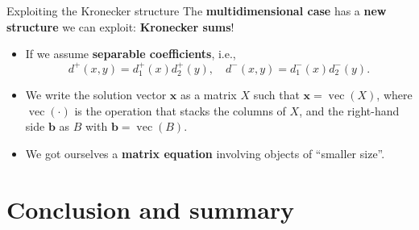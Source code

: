 \documentclass[aspectratio=169,xcolor=dvipsnames]{beamer}
\begin{document}
	\begin{frame}{Exploiting the Kronecker structure}
	The \textbf{multidimensional case} has a \textbf{new structure} we can exploit: \textbf{Kronecker sums}!
	\only<1>{
	\[A_\mathbf{N} = \nu I_\mathbf{N} - \left( D_\mathbf{N}^+ (G_{N_x} \otimes I_{N_y}) +  D_\mathbf{N}^- (I_{N_x} \otimes G_{N_y}) \right), \qquad \mathbf{N} = (N_x,N_y).\]
	}
	\only<2-3>{
	\[A_\mathbf{N} = \nu I_{N_x} \otimes I_{N_y} - \left( D_\mathbf{N}^+ (G_{N_x} \otimes I_{N_y}) +  D_\mathbf{N}^- (I_{N_x} \otimes G_{N_y}) \right), \qquad \mathbf{N} = (N_x,N_y).\]
	}
	\only<4>{
	\[A_\mathbf{N} = \nu I_{N_x} \otimes I_{N_y} - \left( (D_\mathbf{1,N_x}^+ \otimes D_{2,N_y}^+) (G_{N_x} \otimes I_{N_y}) +  (D_\mathbf{1,N_x}^- \otimes D_{2,N_y}^-) (I_{N_x} \otimes G_{N_y}) \right) \]
	}
	\only<5->{
	\[\text{ Find }X \text{ s.t. } \nu X - D_{2,N_y}^+ X G_{N_x}^T D_{1,N_x}^+ - D_{2,N_y}^- G_{N_y} X D_{1,N_x}^- = B \]
	}
	\begin{itemize}
		\item<3->[\faCogs] If we assume \textbf{separable coefficients}, i.e.,
		\[
		d^+(x,y) = d^+_1(x)d^+_2(y), \quad d^-(x,y) = d^-_1(x)d^-_2(y).
		\]
		\item<4->[\faCogs] We write the solution vector $\mathbf{x}$ as a matrix $X$ such that $\mathbf{x} = \operatorname{vec}(X)$, where $\operatorname{vec}(\cdot)$ is the operation that stacks the columns of $X$, and the right-hand side $\mathbf{b}$ as $B$ with $\mathbf{b} = \operatorname{vec}(B)$.
		\item<5->[\faWrench] We got ourselves a \textbf{matrix equation} involving objects of ``smaller size''.
	\end{itemize}
	\end{frame}

\section{Conclusion and summary}
\end{document}
